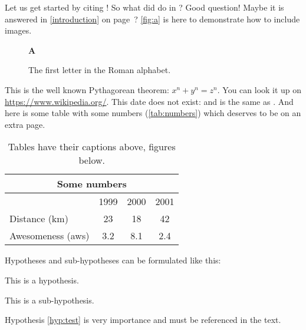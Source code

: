 Let us get started by citing \cite{BeckKKF13}!
So what did \citeauthor{BeckKKF13} do in \citeyear{BeckKKF13}?
Good question!
Maybe it is answered in \cref{introduction} on page~\pageref{introduction}?
\autoref{fig:a} is here to demonstrate how to include images.
\begin{figure}[bt]%
  \begin{center}{\huge\bfseries A}\end{center}
  \caption{The first letter in the Roman alphabet.}\label{fig:a}
\end{figure}
This is the well known Pythagorean theorem: $x^n + y^n = z^n$.
You can look it up on \url{https://www.wikipedia.org/}.
This date does not exist: 
and is the same as .
And here is some table with some numbers (\autoref{tab:numbers})
which deserves to be on an extra page.

\begin{table}[p]%
  \caption{Tables have their captions above, figures below.}
  \begin{center}
    \begin{tabular}{lccc}\toprule
      \multicolumn{4}{c}{Some numbers}       \\\midrule
                        & 1999 & 2000 & 2001 \\\cmidrule(l){2-4}
      Distance (km)     & 23   & 18   & 42   \\
      Awesomeness (aws) & 3.2  & 8.1  & 2.4  \\\bottomrule
    \end{tabular}
  \end{center}\label{tab:numbers}%
\end{table}

Hypotheses and sub-hypotheses can be formulated like this:
\begin{hypothesis}
\label{hyp:test}
This is a hypothesis.
\end{hypothesis}
\begin{shypothesis}
\label{shyp:test}
This is a sub-hypothesis.
\end{shypothesis}
Hypothesis \cref{hyp:test} is very importance and must be referenced in the text.

\lipsum

